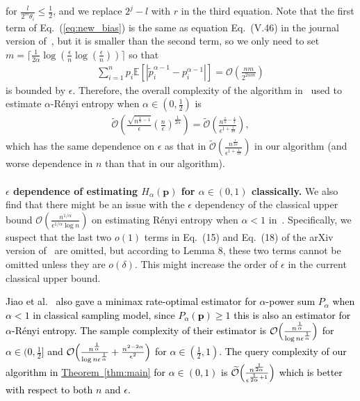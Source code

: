 \documentclass[journal]{IEEEtran}
\newcommand{\eq}[1]{Eq.~(\ref{eq:#1})}
\newcommand{\thm}[1]{\hyperref[thm:#1]{Theorem~\ref*{thm:#1}}}
\begin{document}
for $\frac{l}{2^m \theta_i} \le \frac{1}{2}$, and we replace $2^j-l$ with $r$ in the third equation. Note that the first term of \eq{new_bias} is the same as equation Eq.~(V.46) in the journal version of~\cite{li2019entropy}, but it is smaller than the second term, so we only need to set $m = \lceil \frac{1}{2\alpha}\log(\frac{\epsilon}{n}\log(\frac{\epsilon}{n}))\rceil$ so that
\begin{align}
\sum_{i=1}^{n}p_i \mathbb{E}\left[\left|\tilde{p}_i^{\alpha-1}-p_i^{\alpha-1}\right|\right] = \mathcal{O}\left(\frac{nm}{2^{2\alpha m}}\right)
\end{align}
is bounded by $\epsilon$. Therefore, the overall complexity of the algorithm in~\cite{li2019entropy} used to estimate $\alpha$-R{\'e}nyi entropy when $\alpha\in(0,\frac{1}{2})$ is 
\begin{align}
\widetilde{\mathcal{O}}\left(\frac{\sqrt{n^{\frac{1}{\alpha}-1}}}{\epsilon}\left(\frac{n}{\epsilon}\right)^{\frac{1}{2\alpha}}\right) = \widetilde{\mathcal{O}}\left(\frac{n^{\frac{1}{\alpha}-\frac{1}{2}}}{\epsilon^{1+\frac{1}{2\alpha}}}\right),
\end{align}
which has the same dependence on $\epsilon$ as that in  $\widetilde{\mathcal{O}}(\frac{n^{\frac{1}{2\alpha}}}{\epsilon^{1+\frac{1}{2\alpha}}})$ in our algorithm (and worse dependence in $n$ than that in our algorithm).
\\\\
\noindent \textbf{$\epsilon$ dependence of estimating $H_{\alpha}(\mathbf{p})$ for $\alpha \in (0,1)$ classically.\quad}
We also find that there might be an issue with the $\epsilon$ dependency of the classical upper bound $\mathcal{O}\left(\frac{n^{1 / \alpha}}{\epsilon^{1 / \alpha} \log n}\right)$ on estimating R{\'e}nyi entropy when $\alpha < 1$ in~\cite{acharya2016estimating}. Specifically, we suspect that the last two $o(1)$ terms in Eq.~(15) and Eq.~(18) of the arXiv version of~\cite{acharya2016estimating} are omitted, but according to Lemma 8, these two terms cannot be omitted unless they are $o(\delta)$. This might increase the order of $\epsilon$ in the current classical upper bound.

\textcolor{black}{Jiao et al.~\cite{jiao2015minimax} also gave a minimax rate-optimal estimator for $\alpha$-power sum $P_{\alpha}$ when $\alpha < 1$ in classical sampling model, since $P_{\alpha}(\mathbf{p}) \ge 1$ this is also an estimator for $\alpha$-R{\'e}nyi entropy. The sample complexity of their estimator is $\mathcal{O}\Bigl(\frac{n^{\frac{1}{\alpha}}}{\log n \epsilon^{\frac{1}{\alpha}}}\Bigr)$ for $\alpha\in(0,\frac{1}{2}]$ and $\mathcal{O}\Bigl(\frac{n^{\frac{1}{\alpha}}}{\log n \epsilon^{\frac{1}{\alpha}}}+\frac{n^{2-2\alpha}}{\epsilon^2}\Bigr)$ for $\alpha\in(\frac{1}{2},1)$. The query complexity of our algorithm in \thm{main} for $\alpha \in (0,1)$ is  $\widetilde{\mathcal{O}}\Bigl(\frac{n^{\frac{1}{2\alpha}}}{\epsilon^{\frac{1}{2\alpha}+1}}\Bigr)$ which is better with respect to both $n$ and $\epsilon$. }
\end{document}

